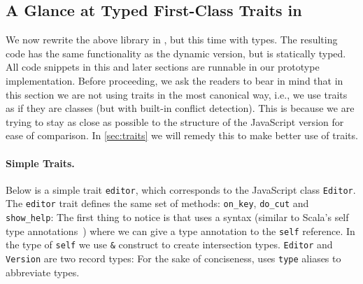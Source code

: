 

\subsection{A Glance at Typed First-Class Traits in \name}

We now rewrite the above library in \name, but this time with types. The resulting code has the same functionality as the dynamic version, but is
statically typed. All code snippets in this and later sections are runnable in
our prototype implementation. Before proceeding, we ask the readers to bear in mind that in this section we are not using traits
in the most canonical way, i.e., we use traits as if they are classes (but with
built-in conflict detection). This is because we are trying to stay as close as possible
to the structure of the JavaScript version for ease of comparison. In
\cref{sec:traits} we will remedy this to make better use of traits.

\paragraph{Simple Traits.}
Below is a simple trait \lstinline{editor}, which corresponds to the JavaScript
class \lstinline{Editor}. The \lstinline{editor} trait defines the same set of
methods: \lstinline{on_key}, \lstinline{do_cut} and \lstinline{show_help}:
The first thing to notice is that \name uses a syntax (similar to Scala's
self type annotations~\cite{odersky2004overview}) where we can give a type annotation to the
\lstinline{self} reference. In the type of \lstinline{self} we use
\lstinline{&} construct to create intersection types. \lstinline{Editor} and \lstinline{Version} are two record types:
For the sake of conciseness, \name uses \lstinline{type} aliases to abbreviate types.

